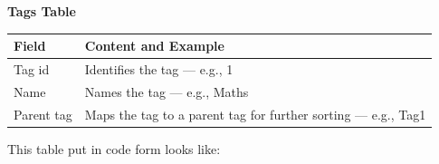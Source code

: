 \textbf{Tags Table}


\begin{tabularx}{\textwidth}{@{}lX@{}}
    \toprule
    \textbf{Field}     & \textbf{Content and Example} \\
    \midrule
    Tag id             & Identifies the tag — e.g., 1 \\
    Name               & Names the tag — e.g., Maths \\
    Parent tag         & Maps the tag to a parent tag for further sorting — e.g., Tag1 \\
    \bottomrule
\end{tabularx}

This table put in code form looks like:

\begin{center}
\inputminted[linenos, tabsize=2, breaklines]{python}{research/7_DatabaseStorageMethods/media/sqlCode.sql}
\end{center}
